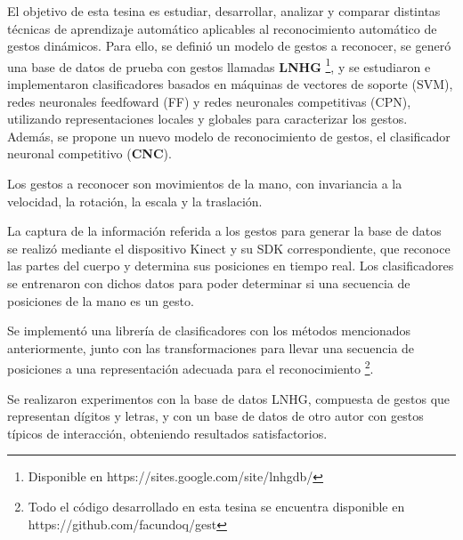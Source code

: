 El objetivo de esta tesina es estudiar, desarrollar, analizar y comparar distintas técnicas de aprendizaje automático aplicables al reconocimiento automático de gestos dinámicos. Para ello, se definió un modelo de gestos a reconocer, se generó una base de datos de prueba con gestos llamadas \textbf{LNHG} \footnote{Disponible en https://sites.google.com/site/lnhgdb/}, y se estudiaron e implementaron clasificadores basados en máquinas de vectores de soporte (SVM), redes neuronales feedfoward (FF) y redes neuronales competitivas (CPN), utilizando representaciones locales y globales para caracterizar los gestos. Además, se propone un nuevo modelo de reconocimiento de gestos, el clasificador neuronal competitivo (\textbf{CNC}).

Los gestos a reconocer son movimientos de la mano, con invariancia a la velocidad, la rotación, la escala y la traslación. 

La captura de la información referida a los gestos para generar la base de datos se realizó mediante el dispositivo Kinect y su SDK correspondiente, que reconoce las partes del cuerpo y determina sus posiciones en tiempo real. Los clasificadores se entrenaron con dichos datos para poder determinar si una secuencia de posiciones de la mano es un gesto. 

Se implementó una librería de clasificadores con los métodos mencionados anteriormente, junto con las transformaciones para llevar una secuencia de posiciones a una representación adecuada para el reconocimiento \footnote{Todo el código desarrollado en esta tesina se encuentra disponible en https://github.com/facundoq/gest}.

Se realizaron experimentos con la base de datos LNHG, compuesta de gestos que representan dígitos y letras, y con un base de datos de otro autor con gestos típicos de interacción, obteniendo resultados satisfactorios.

